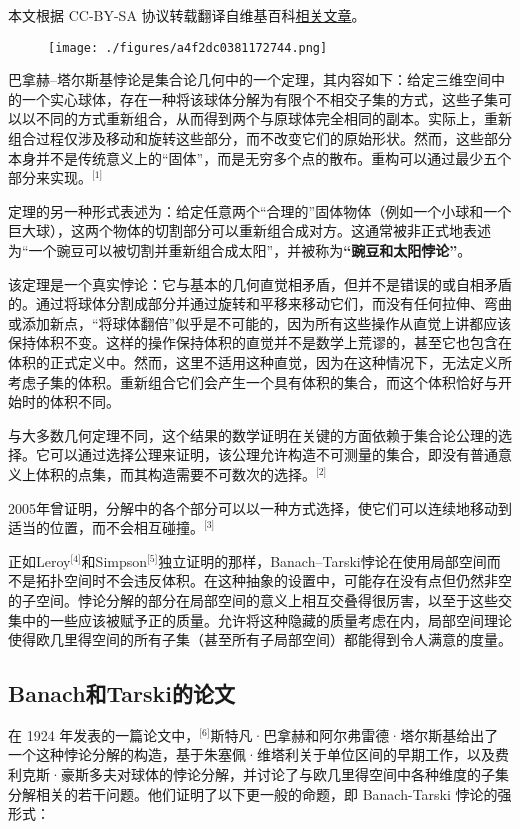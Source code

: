 
本文根据 CC-BY-SA 协议转载翻译自维基百科\href{https://en.wikipedia.org/wiki/Banach\%E2\%80\%93Tarski_paradox}{相关文章}。

\begin{figure}[ht]
\centering
\texttt{[image: ./figures/a4f2dc0381172744.png]}
\caption{} \label{fig_BTS_1}
\end{figure}
巴拿赫–塔尔斯基悖论是集合论几何中的一个定理，其内容如下：给定三维空间中的一个实心球体，存在一种将该球体分解为有限个不相交子集的方式，这些子集可以以不同的方式重新组合，从而得到两个与原球体完全相同的副本。实际上，重新组合过程仅涉及移动和旋转这些部分，而不改变它们的原始形状。然而，这些部分本身并不是传统意义上的“固体”，而是无穷多个点的散布。重构可以通过最少五个部分来实现。\(^\text{[1]}\)

定理的另一种形式表述为：给定任意两个“合理的”固体物体（例如一个小球和一个巨大球），这两个物体的切割部分可以重新组合成对方。这通常被非正式地表述为“一个豌豆可以被切割并重新组合成太阳”，并被称为\textbf{“豌豆和太阳悖论”}。

该定理是一个真实悖论：它与基本的几何直觉相矛盾，但并不是错误的或自相矛盾的。通过将球体分割成部分并通过旋转和平移来移动它们，而没有任何拉伸、弯曲或添加新点，“将球体翻倍”似乎是不可能的，因为所有这些操作从直觉上讲都应该保持体积不变。这样的操作保持体积的直觉并不是数学上荒谬的，甚至它也包含在体积的正式定义中。然而，这里不适用这种直觉，因为在这种情况下，无法定义所考虑子集的体积。重新组合它们会产生一个具有体积的集合，而这个体积恰好与开始时的体积不同。

与大多数几何定理不同，这个结果的数学证明在关键的方面依赖于集合论公理的选择。它可以通过选择公理来证明，该公理允许构造不可测量的集合，即没有普通意义上体积的点集，而其构造需要不可数次的选择。\(^\text{[2]}\)

2005年曾证明，分解中的各个部分可以以一种方式选择，使它们可以连续地移动到适当的位置，而不会相互碰撞。\(^\text{[3]}\)

正如Leroy\(^\text{[4]}\)和Simpson\(^\text{[5]}\)独立证明的那样，Banach–Tarski悖论在使用局部空间而不是拓扑空间时不会违反体积。在这种抽象的设置中，可能存在没有点但仍然非空的子空间。悖论分解的部分在局部空间的意义上相互交叠得很厉害，以至于这些交集中的一些应该被赋予正的质量。允许将这种隐藏的质量考虑在内，局部空间理论使得欧几里得空间的所有子集（甚至所有子局部空间）都能得到令人满意的度量。
\subsection{Banach和Tarski的论文} 
在 1924 年发表的一篇论文中，\(^\text{[6]}\)斯特凡·巴拿赫和阿尔弗雷德·塔尔斯基给出了一个这种悖论分解的构造，基于朱塞佩·维塔利关于单位区间的早期工作，以及费利克斯·豪斯多夫对球体的悖论分解，并讨论了与欧几里得空间中各种维度的子集分解相关的若干问题。他们证明了以下更一般的命题，即 Banach-Tarski 悖论的强形式：

